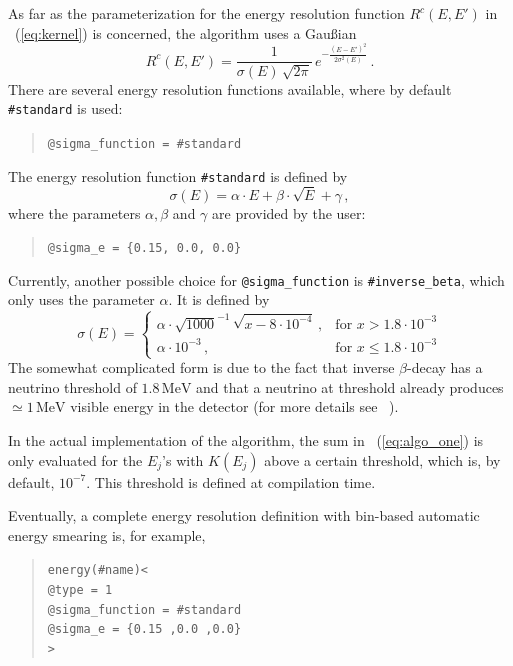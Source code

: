 %
As far as the parameterization for the energy resolution function 
$R^c(E,E')$ in \eq~(\ref{eq:kernel}) is concerned, the algorithm uses
a Gau\ss ian
\begin{equation}
R^c(E,E')=\frac{1}{\sigma(E)\,\sqrt{2\pi}}\,e^{-\frac{(E-E')^2}{2\sigma^2(E)}} \, .
\label{eq:respfun}
\end{equation} 
%
%
There are several energy resolution functions available, where by default
{\tt \#standard} is used:
\begin{quote}
{\tt \tb @sigma\_function = \#standard} 
\end{quote}
%
%
The energy resolution function {\tt \#standard} is defined by
\begin{equation}
\label{eq:sigma_e}
\sigma(E)=\alpha\cdot E + \beta \cdot \sqrt{E} +\gamma\, ,
\end{equation}
where the parameters $\alpha, \beta$ and $\gamma$ are provided by the user:
\begin{quote}
{\tt \tb @sigma\_e = \{0.15, 0.0, 0.0\}}
\end{quote}
Currently, another possible choice for {\tt @sigma\_function} is {\tt \#inverse\_beta},
%
%
which only uses the parameter $\alpha$. It is defined by
\begin{equation}
\sigma(E)= \left\{\begin{array}{cl}
 \alpha \cdot \sqrt{1000}^{-1}\,\sqrt{x-8\cdot10^{-4}}\,,&\mathrm{for}\,\, 
x>1.8\cdot10^{-3}\\
\alpha\cdot10^{-3} \,,&\mathrm{for}\,\, x \leq 1.8\cdot10^{-3}
\end{array} \right.
\end{equation}
The somewhat complicated form is due to the fact that inverse $\beta$-decay
has a neutrino threshold of $1.8\,\mathrm{MeV}$ and that a neutrino
at threshold already produces $\simeq 1\,\mathrm{MeV}$ visible energy in
the detector (for more details see \eg~\cite{Huber:2003pm}). 

In the actual implementation of the algorithm,  the sum in \eq~(\ref{eq:algo_one}) is only evaluated
 for the $E_j$'s with $K(E_j)$ 
above a certain threshold, which is, by default, $10^{-7}$. 
This threshold is defined at compilation time. 

Eventually,  a complete energy resolution definition with bin-based
automatic energy smearing is, for example,
\begin{quote}
{\tt energy(\#name)<\\
\tb @type = 1\\
\tb @sigma\_function = \#standard\\
\tb @sigma\_e = \{0.15 ,0.0 ,0.0\}\\
>
}
\end{quote}

